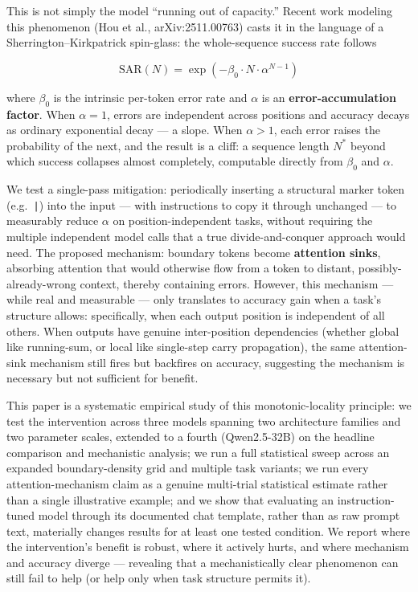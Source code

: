 \documentclass[11pt]{article}
\begin{document}
This is not simply the model ``running out of capacity.'' Recent work modeling this phenomenon (Hou et al., arXiv:2511.00763) casts it in the language of a Sherrington--Kirkpatrick spin-glass: the whole-sequence success rate follows

\begin{equation}
\text{SAR}(N) = \exp\left(-\beta_0 \cdot N \cdot \alpha^{N-1}\right)
\end{equation}

where $\beta_0$ is the intrinsic per-token error rate and $\alpha$ is an \textbf{error-accumulation factor}. When $\alpha = 1$, errors are independent across positions and accuracy decays as ordinary exponential decay --- a slope. When $\alpha > 1$, each error raises the probability of the next, and the result is a cliff: a sequence length $N^*$ beyond which success collapses almost completely, computable directly from $\beta_0$ and $\alpha$.

We test a single-pass mitigation: periodically inserting a structural marker token (e.g.\ \texttt{|}) into the input --- with instructions to copy it through unchanged --- to measurably reduce $\alpha$ on position-independent tasks, without requiring the multiple independent model calls that a true divide-and-conquer approach would need. The proposed mechanism: boundary tokens become \textbf{attention sinks}, absorbing attention that would otherwise flow from a token to distant, possibly-already-wrong context, thereby containing errors. However, this mechanism --- while real and measurable --- only translates to accuracy gain when a task's structure allows: specifically, when each output position is independent of all others. When outputs have genuine inter-position dependencies (whether global like running-sum, or local like single-step carry propagation), the same attention-sink mechanism still fires but backfires on accuracy, suggesting the mechanism is necessary but not sufficient for benefit.

This paper is a systematic empirical study of this monotonic-locality principle: we test the intervention across three models spanning two architecture families and two parameter scales, extended to a fourth (Qwen2.5-32B) on the headline comparison and mechanistic analysis; we run a full statistical sweep across an expanded boundary-density grid and multiple task variants; we run every attention-mechanism claim as a genuine multi-trial statistical estimate rather than a single illustrative example; and we show that evaluating an instruction-tuned model through its documented chat template, rather than as raw prompt text, materially changes results for at least one tested condition. We report where the intervention's benefit is robust, where it actively hurts, and where mechanism and accuracy diverge --- revealing that a mechanistically clear phenomenon can still fail to help (or help only when task structure permits it).
\end{document}
